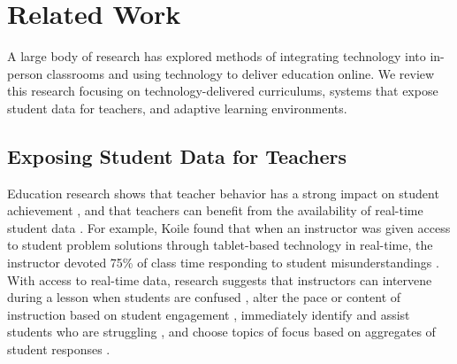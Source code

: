 \documentclass{sigchi}
\begin{document}


\section{Related Work}
A large body of research has explored methods of integrating technology into in-person classrooms and using technology to deliver education online. We review this research focusing on technology-delivered curriculums, systems that expose student data for teachers, and adaptive learning environments.

\subsection{Exposing Student Data for Teachers}
Education research shows that teacher behavior has a strong impact on student achievement \cite{Hill2005, Wentzel2002, Reeve2004, Wright1997}, and that teachers can benefit from the availability of real-time student data \cite{Balaam2010, Koile2006, Lazar2007}. For example, Koile found that when an instructor was given access to student problem solutions through tablet-based technology in real-time, the instructor devoted 75\% of class time responding to student misunderstandings \cite{Koile2006}. With access to real-time data, research suggests that instructors can intervene during a lesson when students are confused \cite{Hickey2014}, alter the pace or content of instruction based on student engagement \cite{Balaam2010}, immediately identify and assist students who are struggling \cite{Lazar2007}, and choose topics of focus based on aggregates of student responses \cite{Koile2006}. 
\end{document}
